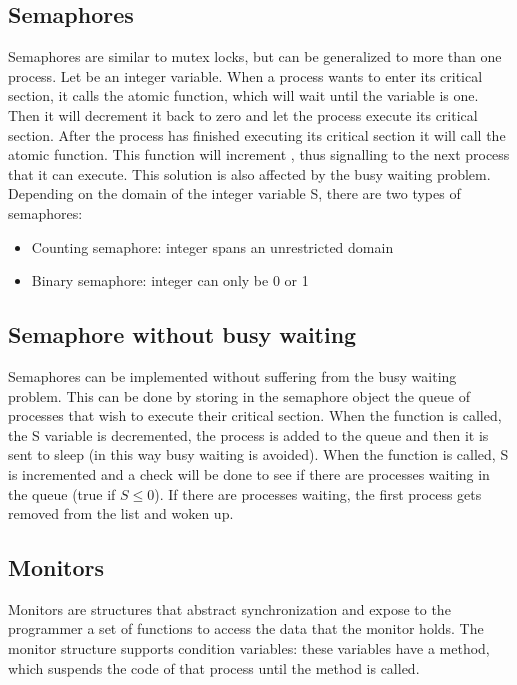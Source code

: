 \subsection{Semaphores}
Semaphores are similar to mutex locks, but can be generalized to more than one process. Let  be an integer variable. When a process wants to enter its critical section, it calls the  atomic function, which will wait until the  variable is one. Then it will decrement it back to zero and let the process execute its critical section. After the process has finished executing its critical section it will call the  atomic function. This function will increment , thus signalling to the next process that it can execute. This solution is also affected by the busy waiting problem. Depending on the domain of the integer variable S, there are two types of semaphores:
\begin{itemize}
    \item Counting semaphore: integer spans an unrestricted domain
    \item Binary semaphore: integer can only be 0 or 1
\end{itemize}

\subsection{Semaphore without busy waiting}
Semaphores can be implemented without suffering from the busy waiting problem. This can be done by storing in the semaphore object the queue of processes that wish to execute their critical section. When the  function is called, the S variable is decremented, the process is added to the queue and then it is sent to sleep (in this way busy waiting is avoided). When the  function is called, S is incremented and a check will be done to see if there are processes waiting in the queue (true if $S\le0$). If there are processes waiting, the first process gets removed from the list and woken up.

\subsection{Monitors}
Monitors are structures that abstract synchronization and expose to the programmer a set of functions to access the data that the monitor holds.
The monitor structure supports condition variables: these variables have a  method, which suspends the code of that process until the  method is called.

